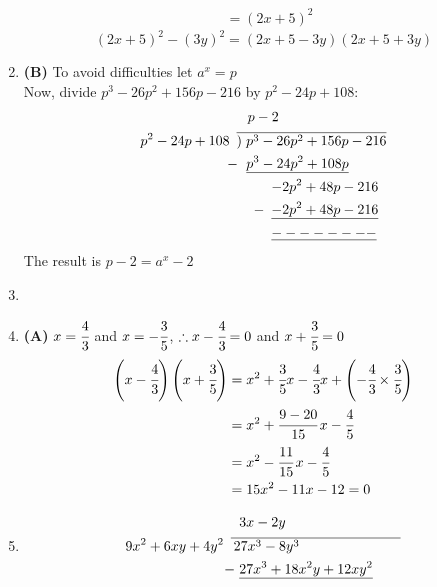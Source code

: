 \begin{multicols}{2}
\begin{enumerate}[label={\textbf{\arabic*.}}]
\begin{align*}
&= (2x + 5)^2
\end{align*}
\[(2x + 5)^2 - (3y)^2 = (2x + 5 - 3y)(2x + 5 + 3y) \]
\item \textbf{(B)} To avoid difficulties let \( a^x = p \) \\
Now, divide \(p^3 - 26p^2 + 156p - 216 \) by \( p^2 - 24p + 108 \):
\begin{align*}
& \hspace{8pt} p - 2 \\
p^2 - 24p + 108 \hspace{5pt} & \overline{)\hspace{3pt} p^3 - 26p^2 + 156p - 216} \\
-\hspace{-1pt} & \hspace{7pt} \underline{p^3 - 24p^2 + 108p} \\
& \hspace{25pt} {-2p^2 + 48p - 216} \\
-\hspace{-20pt} & \hspace{25pt} \underline{-2p^2 + 48p - 216} \\
& \hspace{25pt} \underline{--------}
\end{align*}
The result is \( p - 2 = a^x - 2 \)
\item
\item \textbf{(A)} \( x = \cfrac{4}{3} \) and \( x = -\cfrac{3}{5} \), \hspace{5pt} \( \therefore  x-\cfrac{4}{3} = 0 \) and \( x+\cfrac{3}{5} = 0 \)
\begin{align*}
\left(x-\cfrac{4}{3}\right)\left(x+\cfrac{3}{5}\right) &= x^2 + \cfrac{3}{5}x - \cfrac{4}{3}x + \left(-\cfrac{4}{3} \times \cfrac{3}{5}\right) \\
&= x^2  +  \cfrac{9 - 20}{15}\,x -\cfrac{4}{5} \\
&= x^2 - \cfrac{11}{15}\,x -\cfrac{4}{5} \\
&= 15x^2 - 11x - 12 = 0
\end{align*}
\item
\begin{align*}
&\hspace{6pt} 3x - 2y \\
9x^2 + 6xy + 4y^2 \hspace{5pt}  & \overline{\hspace{2pt} 27x^3 - 8y^3 \hspace{1in}} \\
-\hspace{-3pt} & \hspace{6pt} \underline{27x^3 + 18x^2y + 12xy^2} \\

\end{align*}
\end{enumerate}
\end{multicols}
